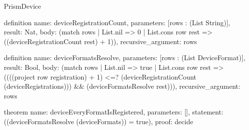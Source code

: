 \begin{lexlean}{PrismDevice}
\begin{semanticmodule}
definition{
  name: deviceRegistrationCount,
  parameters: [rows : (List String)],
  result: Nat,
  body: (match rows | List.nil => 0 | List.cons row rest => ((deviceRegistrationCount rest) + 1)),
  recursive_argument: rows
}

definition{
  name: deviceFormatsResolve,
  parameters: [rows : (List DeviceFormat)],
  result: Bool,
  body: (match rows
    | List.nil => true
    | List.cons row rest => ((((project row registration) + 1) <=? (deviceRegistrationCount (deviceRegistrations))) && (deviceFormatsResolve rest))),
  recursive_argument: rows
}

theorem{
  name: deviceEveryFormatIsRegistered,
  parameters: [],
  statement: ((deviceFormatsResolve (deviceFormats)) = true),
  proof: decide{}
}
\end{semanticmodule}
\end{lexlean}
